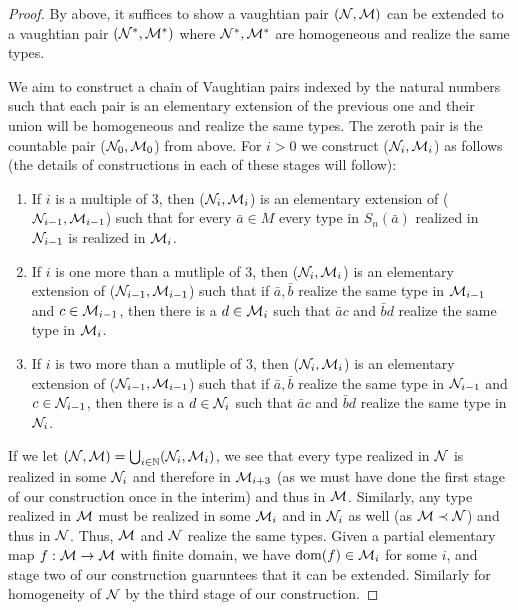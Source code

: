 \begin{proof}%
By above, it suffices to show a vaughtian pair \((\mathcal{N}, \mathcal{M})\) can be extended to a vaughtian pair \((\mathcal{N}^*, \mathcal{M}^*)\) where \(\mathcal{N}^*, \mathcal{M}^*\) are homogeneous and realize the same types. 

We aim to construct a chain of Vaughtian pairs indexed by the natural numbers such that each pair is an elementary extension of the previous one and their union will be homogeneous and realize the same types. 
The zeroth pair is the countable pair (\(\mathcal{N}_0, \mathcal{M}_0\)) from above. 
For \(i > 0\) we construct (\(\mathcal{N}_i, \mathcal{M}_i\)) as follows (the details of constructions in each of these stages will follow):

\begin{enumerate}

  \item  If \(i\) is a multiple of 3, then (\(\mathcal{N}_i, \mathcal{M}_i\)) is an elementary extension of (\(\mathcal{N}_{i-1}, \mathcal{M}_{i-1}\)) such that for every \(\bar{a} \in M\) every type in \(S_n(\bar{a})\) realized in \(\mathcal{N}_{i-1}\) is realized in \(\mathcal{M}_i\). %

  \item  If \(i\) is one more than a mutliple of 3, then (\(\mathcal{N}_i, \mathcal{M}_i\)) is an elementary extension of (\(\mathcal{N}_{i-1}, \mathcal{M}_{i-1}\)) such that if \(\bar{a}, \bar{b}\) realize the same type in \(\mathcal{M}_{i-1}\) and \(c \in \mathcal{M}_{i-1}\), then there is a \(d \in \mathcal{M}_i\) such that \(\bar{a}c\) and \(\bar{b}d\) realize the same type in \(\mathcal{M}_i\). 

  \item If \(i\) is two more than a mutliple of 3, then (\(\mathcal{N}_i, \mathcal{M}_i\)) is an elementary extension of (\(\mathcal{N}_{i-1}, \mathcal{M}_{i-1}\)) such that if \(\bar{a}, \bar{b}\) realize the same type in \(\mathcal{N}_{i-1}\) and \(c \in \mathcal{N}_{i-1}\), then there is a \(d \in \mathcal{N}_i\) such that \(\bar{a}c\) and \(\bar{b}d\) realize the same type in \(\mathcal{N}_i\).

\end{enumerate}

If we let \((\mathcal{N}, \mathcal{M}) = \bigcup_{i \in \mathbb{N}}(\mathcal{N}_i, \mathcal{M}_i)\), we see that every type realized in \(\mathcal{N}\) is realized in some \(\mathcal{N}_i\) and therefore in \(\mathcal{M}_{i+3}\) (as we must have done the first stage of our construction once in the interim) and thus in \(\mathcal{M}\). 
Similarly, any type realized in \(\mathcal{M}\) must be realized in some \(\mathcal{M}_i\) and in \(\mathcal{N}_i\) as well (as \(\mathcal{M} \prec \mathcal{N}\)) and thus in \(\mathcal{N}\).
Thus, \(\mathcal{M}\) and  \(\mathcal{N}\) realize the same types.  
Given a partial elementary map \(f:\mathcal{M} \to \mathcal{M}\) with finite domain, we have \(\text{dom}(f) \in \mathcal{M}_i\) for some \(i\), and stage two of our construction guaruntees that it can be extended. 
Similarly for homogeneity of \(\mathcal{N}\) by the third stage of our construction. 


\end{proof}
